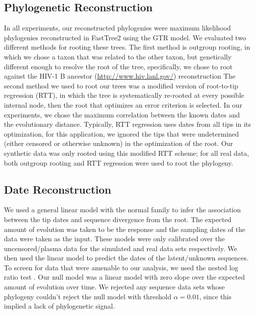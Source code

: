 \subsection * {Phylogenetic Reconstruction} \label{subsec:phylo}
In all experiments, our reconstructed phylogenies were maximum likelihood phylogenies reconstructed in FastTree2 using the GTR model.
We evaluated two different methods for rooting these trees. The first method is outgroup rooting, in which we chose a taxon that was related to the other taxon, but genetically different enough to resolve the root of the tree, specifically, we chose to root against the HIV-1 B ancestor (\href{http://www.hiv.lanl.gov/}{http://www.hiv.lanl.gov/}) reconstruction
The second method we used to root our trees was a modified version of root-to-tip regression (RTT), in which the tree is systematically re-rooted at every possible internal node, then the root that optimizes an error criterion is selected.
In our experiments, we chose the maximum correlation between the known dates and the evolutionary distance.
Typically, RTT regression uses dates from all tips in its optimization, for this application, we ignored the tips that were undetermined (either censored or otherwise unknown) in the optimization of the root. 
Our synthetic data was only rooted using this modified RTT scheme; for all real data, both outgroup rooting and RTT regression were used to root the phylogeny. 


\subsection * {Date Reconstruction} \label{subsec:daterecon}
We used a general linear model with the normal family to infer the association between the tip dates and sequence divergence from the root. 
The expected amount of evolution was taken to be the response and the sampling dates of the data were taken as the input. 
These models were only calibrated over the uncensored/plasma data for the simulated and real data sets respectively.
We then used the linear model to predict the dates of the latent/unknown sequences.
To screen for data that were amenable to our analysis, we used the nested log ratio test \citep{Ho14}. 
Our null model was a linear model with zero slope over the expected amount of evolution over time. 
We rejected any sequence data sets whose phylogeny couldn't reject the null model with threshold $\alpha=0.01$, since this implied a lack of phylogenetic signal.


